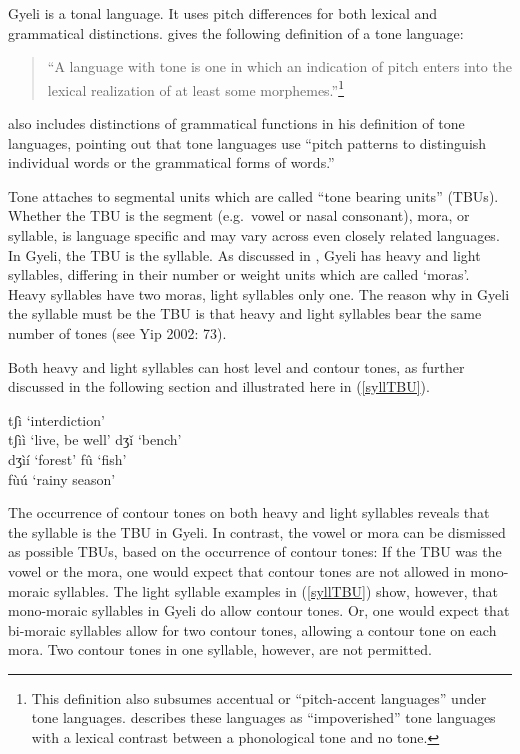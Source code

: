 Gyeli is a tonal language. It uses pitch differences for both lexical and grammatical distinctions. \citet[4]{yip2002} gives the following definition of a tone language:
\begin{quote}
``A language with tone is one in which an indication of pitch enters into the lexical realization of at least some morphemes.''\footnote{This definition also subsumes accentual or ``pitch-accent languages'' under tone languages. \citet[258]{yip2002} describes these languages as ``impoverished'' tone languages with a lexical contrast between a phonological tone and no tone.}
\end{quote}

\citet{maddieson2013} also includes distinctions of grammatical functions in his definition of tone languages, pointing out that tone languages use ``pitch patterns to distinguish individual words or the grammatical forms of words.''

Tone attaches to segmental units which are called ``tone bearing units'' (TBUs). Whether the TBU is the segment (e.g.\ vowel or nasal consonant), mora, or syllable, is language specific and may vary across even closely related languages. In Gyeli, the TBU is the syllable. As discussed in , Gyeli has heavy and light syllables, differing in their number or weight units which are called `moras'. Heavy syllables have two moras, light syllables only one. The reason why in Gyeli the syllable must be the TBU is that heavy and light syllables bear the same number of tones (see Yip 2002: 73).

Both heavy and  light syllables can host level and contour tones, as further discussed in the following section and illustrated here in (\ref{syllTBU}).

\begin{exe}
\ex\label{syllTBU}
\begin{xlist}
\ex tʃì  `interdiction' \\
      tʃìì `live, be well'
\ex dʒǐ `bench' \\
      dʒìí `forest'
\ex fû `fish' \\
      fùú `rainy season'
\end{xlist}
\end{exe}


\noindent The occurrence of contour tones on both heavy and light syllables reveals that the syllable is the TBU in Gyeli. In contrast, the vowel or mora can be dismissed as possible TBUs, based on the occurrence of contour tones: If the TBU was the vowel or the mora, one would expect that contour tones are not allowed in mono-moraic syllables. The light syllable examples in (\ref{syllTBU}) show, however, that mono-moraic syllables in Gyeli do allow contour tones. Or, one would expect that bi-moraic syllables allow for two contour tones, allowing a contour tone on each mora. Two contour tones in one syllable, however, are not permitted.

